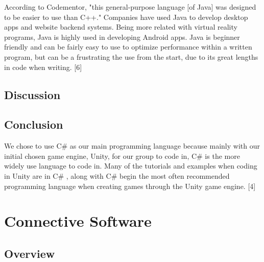 \documentclass[letterpaper,10pt,onecolumn,compsoc]{IEEEtran}
\begin{document}

\noindent
According to Codementor, "this general-purpose language [of Java] was designed to be easier to use than C++." Companies have used Java to develop desktop apps and website backend systems. Being more related with virtual reality programs, Java is highly used in developing Android apps. Java is beginner friendly and can be fairly easy to use to optimize performance within a written program, but can be a frustrating the use from the start, due to its great lengths in code when writing. [6]

\subsection{Discussion}

\iffalse
\noindent\leavevmode\rlap{\textbf{0,0}}\hfill{\textbf{0,1}}\hfill\llap{\textbf{0,2}}\par

\noindent\leavevmode\rlap{\textbf{1,0}}\hfill{\textbf{1,1}}\hfill\llap{\textbf{1,2}}\par

\noindent\leavevmode\rlap{\textbf{2,0}}\hfill{\textbf{2,1}}\hfill\llap{\textbf{2,2}}\par
\fi

\subsection{Conclusion}

\noindent
We chose to use C\# as our main programming language because mainly with our initial chosen game engine, Unity, for our group to code in, C\# is the more widely use language to code in. Many of the tutorials and examples when coding in Unity are in C\# , along with C\# begin the most often recommended programming language when creating games through the Unity game engine. [4]

\section{Connective Software}
\subsection{Overview}
\end{document}
